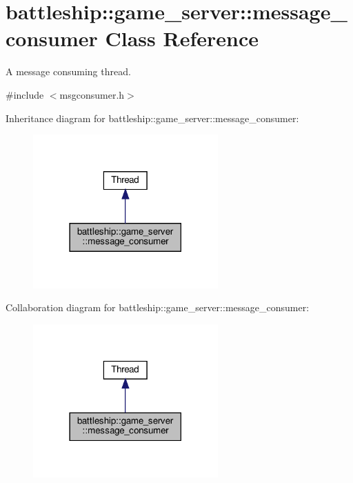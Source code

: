 \hypertarget{classbattleship_1_1game__server_1_1message__consumer}{}\section{battleship\+:\+:game\+\_\+server\+:\+:message\+\_\+consumer Class Reference}
\label{classbattleship_1_1game__server_1_1message__consumer}


A message consuming thread.  




{\ttfamily \#include $<$msgconsumer.\+h$>$}



Inheritance diagram for battleship\+:\+:game\+\_\+server\+:\+:message\+\_\+consumer\+:
\nopagebreak
\begin{figure}[H]
\begin{center}
\leavevmode
\includegraphics[width=201pt]{classbattleship_1_1game__server_1_1message__consumer__inherit__graph}
\end{center}
\end{figure}


Collaboration diagram for battleship\+:\+:game\+\_\+server\+:\+:message\+\_\+consumer\+:
\nopagebreak
\begin{figure}[H]
\begin{center}
\leavevmode
\includegraphics[width=201pt]{classbattleship_1_1game__server_1_1message__consumer__coll__graph}
\end{center}
\end{figure}
